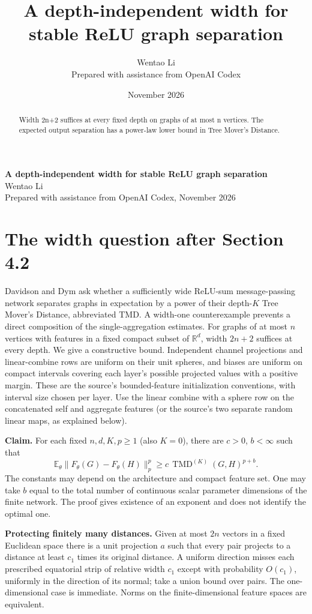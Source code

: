 \documentclass[10pt]{article}
\title{A depth-independent width for stable ReLU graph separation}
\author{Wentao Li\\{\small Prepared with assistance from OpenAI Codex}}
\date{November 2026}
\begin{document}
\begin{center}{\Large\bfseries A depth-independent width for stable ReLU graph separation}\\[3pt]Wentao Li\\{\small Prepared with assistance from OpenAI Codex, November 2026}\end{center}
\begin{abstract}
Width 2n+2 suffices at every fixed depth on graphs of at most n vertices. The expected output separation has a power-law lower bound in Tree Mover's Distance.
\end{abstract}
\section*{The width question after Section 4.2}
Davidson and Dym ask whether a sufficiently wide ReLU-sum message-passing network separates graphs in expectation by a power of their depth-$K$ Tree Mover's Distance, abbreviated TMD. A width-one counterexample prevents a direct composition of the single-aggregation estimates. For graphs of at most $n$ vertices with features in a fixed compact subset of $\mathbb R^d$, width $2n+2$ suffices at every depth. We give a constructive bound. Independent channel projections and linear-combine rows are uniform on their unit spheres, and biases are uniform on compact intervals covering each layer's possible projected values with a positive margin. These are the source's bounded-feature initialization conventions, with interval size chosen per layer. Use the linear combine with a sphere row on the concatenated self and aggregate features (or the source's two separate random linear maps, as explained below).

\textbf{Claim.} For each fixed $n,d,K,p\ge1$ (also $K=0$), there are $c>0$, $b<\infty$ such that
\[
 \mathbb E_\theta\|F_\theta(G)-F_\theta(H)\|_p^p
       \ge c\,\operatorname{TMD}^{(K)}(G,H)^{p+b}.
\]
The constants may depend on the architecture and compact feature set. One may take $b$ equal to the total number of continuous scalar parameter dimensions of the finite network. The proof gives existence of an exponent and does not identify the optimal one.

\textbf{Protecting finitely many distances.} Given at most $2n$ vectors in a fixed Euclidean space there is a unit projection $a$ such that every pair projects to a distance at least $c_1$ times its original distance. A uniform direction misses each prescribed equatorial strip of relative width $c_1$ except with probability $O(c_1)$, uniformly in the direction of its normal; take a union bound over pairs. The one-dimensional case is immediate. Norms on the finite-dimensional feature spaces are equivalent.
\end{document}
